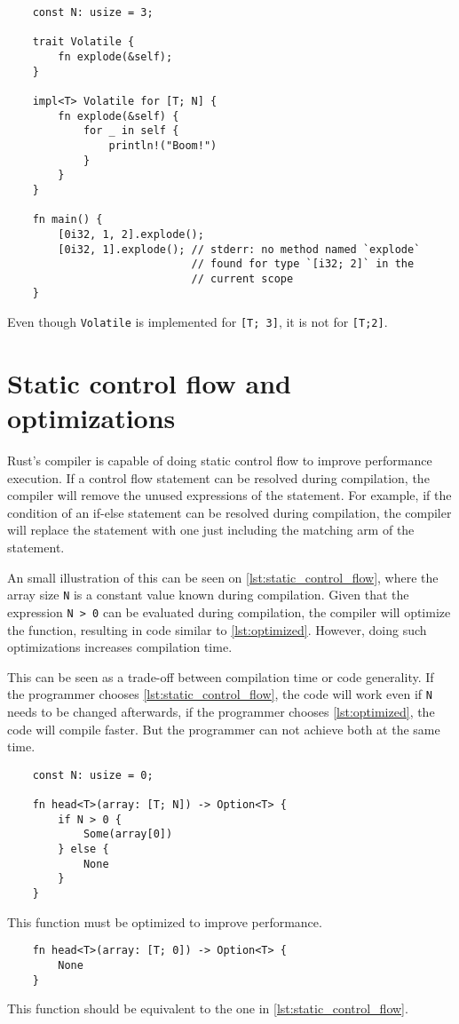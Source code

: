 \begin{listing}
	\begin{verbatim} 
    const N: usize = 3;

    trait Volatile {
        fn explode(&self);
    }

    impl<T> Volatile for [T; N] {
        fn explode(&self) {
            for _ in self {
                println!("Boom!")
            }
        }
    }

    fn main() {
        [0i32, 1, 2].explode(); 
        [0i32, 1].explode(); // stderr: no method named `explode` 
                             // found for type `[i32; 2]` in the
                             // current scope
    }
	\end{verbatim}
    \caption{Even though \texttt{Volatile} is implemented for \texttt{[T; 3]}, it is not for \texttt{[T;2]}.}
  \label{lst:trait_array}
\end{listing}

\section{Static control flow and optimizations}
Rust's compiler is capable of doing static control flow to improve performance execution. If a control flow statement can be resolved during compilation, the compiler will remove the unused expressions of the statement. For example, if the condition of an if-else statement can be resolved during compilation, the compiler will replace the statement with one just including the matching arm of the statement.

An small illustration of this can be seen on \ref{lst:static_control_flow}, where the array size \texttt{N} is a constant value known during compilation. Given that the expression  \texttt{N > 0} can be evaluated during compilation, the compiler will optimize the function, resulting in code similar to \ref{lst:optimized}. However, doing such optimizations increases compilation time. 

This can be seen as a trade-off between compilation time or code generality. If the programmer chooses \ref{lst:static_control_flow}, the code will work even if \texttt{N} needs to be changed afterwards, if the programmer chooses \ref{lst:optimized}, the code will compile faster. But the programmer can not achieve both at the same time.

\begin{listing}
    \begin{verbatim}
    const N: usize = 0;

    fn head<T>(array: [T; N]) -> Option<T> {
        if N > 0 {
            Some(array[0])
        } else {
            None
        }
    }
    \end{verbatim}
    \caption{This function must be optimized to improve performance.}
    \label{lst:static_control_flow}
\end{listing}

\begin{listing}
    \begin{verbatim}
    fn head<T>(array: [T; 0]) -> Option<T> {
        None
    }
    \end{verbatim}
    \caption{This function should be equivalent to the one in \ref{lst:static_control_flow}.}
    \label{lst:optimized}
\end{listing}
